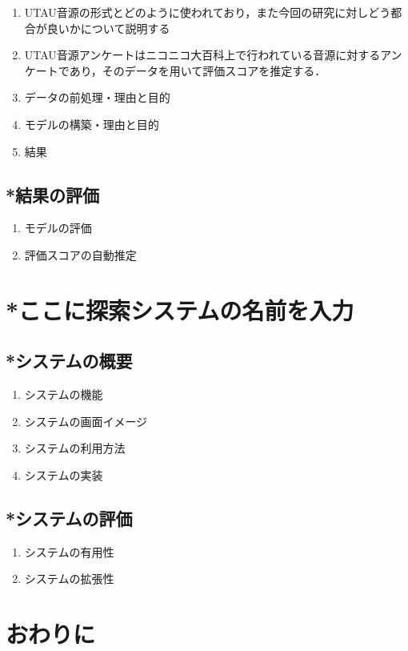 \documentclass[a4j,8pt,twocolumn]{extarticle}
\begin{document}
\begin{enumerate}
  \item UTAU音源の形式とどのように使われており，また今回の研究に対しどう都合が良いかについて説明する
  \item UTAU音源アンケートはニコニコ大百科上で行われている音源に対するアンケートであり，そのデータを用いて評価スコアを推定する．
  \item データの前処理・理由と目的
  \item モデルの構築・理由と目的
  \item 結果
\end{enumerate}

\subsection{*結果の評価}
\begin{enumerate}
  \item モデルの評価
  \item 評価スコアの自動推定
\end{enumerate}

\section{*ここに探索システムの名前を入力}
\subsection{*システムの概要}
\begin{enumerate}
  \item システムの機能
  \item システムの画面イメージ
  \item システムの利用方法
  \item システムの実装
\end{enumerate}

\subsection{*システムの評価}
\begin{enumerate}
  \item システムの有用性
  \item システムの拡張性
\end{enumerate}

\section{おわりに}
\end{document}
